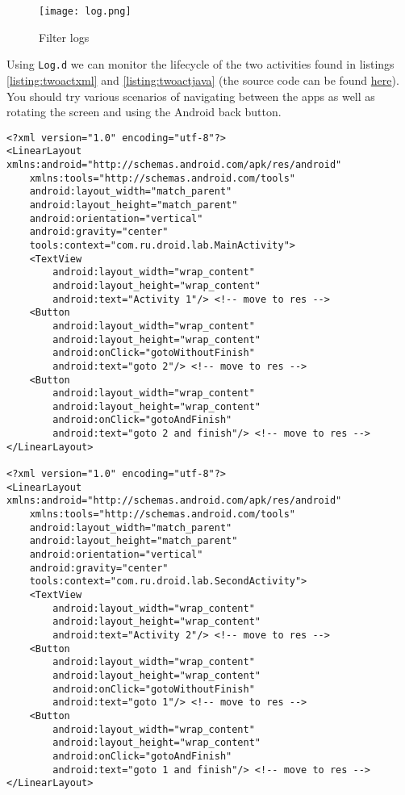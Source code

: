 \begin{figure}[H]
\centering
\texttt{[image: log.png]}
\caption{Filter logs}
\label{fig:logfilt}
\end{figure}

Using \texttt{Log.d} we can monitor the lifecycle of the two activities found in listings \ref{listing:twoactxml} and \ref{listing:twoactjava} (the source code can be found \href{https://github.com/JonSteinn/AndroidDevelopment/tree/master/examples/lab3/lifecycle}{here}). You should try various scenarios of navigating between the apps as well as rotating the screen and using the Android back button.

\begin{lstlisting}[style=A_XML,caption={Two layouts for two activities},label={listing:twoactxml}]
<?xml version="1.0" encoding="utf-8"?>
<LinearLayout xmlns:android="http://schemas.android.com/apk/res/android"
    xmlns:tools="http://schemas.android.com/tools"
    android:layout_width="match_parent"
    android:layout_height="match_parent"
    android:orientation="vertical"
    android:gravity="center"
    tools:context="com.ru.droid.lab.MainActivity">
    <TextView
        android:layout_width="wrap_content"
        android:layout_height="wrap_content"
        android:text="Activity 1"/> <!-- move to res -->
    <Button
        android:layout_width="wrap_content"
        android:layout_height="wrap_content"
        android:onClick="gotoWithoutFinish"
        android:text="goto 2"/> <!-- move to res -->
    <Button
        android:layout_width="wrap_content"
        android:layout_height="wrap_content"
        android:onClick="gotoAndFinish"
        android:text="goto 2 and finish"/> <!-- move to res -->
</LinearLayout>

<?xml version="1.0" encoding="utf-8"?>
<LinearLayout xmlns:android="http://schemas.android.com/apk/res/android"
    xmlns:tools="http://schemas.android.com/tools"
    android:layout_width="match_parent"
    android:layout_height="match_parent"
    android:orientation="vertical"
    android:gravity="center"
    tools:context="com.ru.droid.lab.SecondActivity">
    <TextView
        android:layout_width="wrap_content"
        android:layout_height="wrap_content"
        android:text="Activity 2"/> <!-- move to res -->
    <Button
        android:layout_width="wrap_content"
        android:layout_height="wrap_content"
        android:onClick="gotoWithoutFinish"
        android:text="goto 1"/> <!-- move to res -->
    <Button
        android:layout_width="wrap_content"
        android:layout_height="wrap_content"
        android:onClick="gotoAndFinish"
        android:text="goto 1 and finish"/> <!-- move to res -->
</LinearLayout>

\end{lstlisting}

